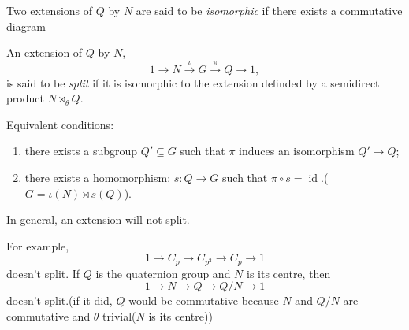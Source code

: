 \begin{definition}
  \label{definition-isomorphic-extension}
  Two extensions of \( Q \) by \( N \) are said to be \emph{isomorphic} if there exists a commutative diagram
  \begin{center}
  \end{center}
\end{definition}
\begin{definition}
  \label{definition-split-sequence}
  An extension of \( Q \) by \( N \),
  \[
    1 \to N \xrightarrow{\iota} G \xrightarrow{\pi} Q \to 1,
  \]
  is said to be \emph{split} if it is isomorphic to the extension definded by a semidirect product \( N \rtimes_\theta Q \).
\end{definition}
\begin{remark}
  \label{remark-split-equivalent-condition}
  Equivalent conditions:
  \begin{enumerate}
    \item there exists a subgroup \( Q' \subseteq G \) such that \( \pi \) induces an isomorphism \( Q' \to Q \);
    \item there exists a homomorphism: \( s: Q \to G \) such that \( \pi \circ s = \operatorname{id} \).(\( G = \iota(N) \rtimes s(Q) \)).
  \end{enumerate}
\end{remark}

In general, an extension will not split.
\begin{example}
  \label{example-not-split}
  For example,
  \[
    1 \to C_p \to C_{p^2} \to C_p \to 1
  \]
  doesn't split.
  If \( Q \) is the quaternion group and \( N \) is its centre, then
  \[
    1 \to N \to Q \to Q / N \to 1
  \]
  doesn't split.(if it did, \( Q \) would be commutative because \( N \) and \( Q / N \) are commutative and \( \theta \) trivial(\( N \) is its centre))
\end{example}


